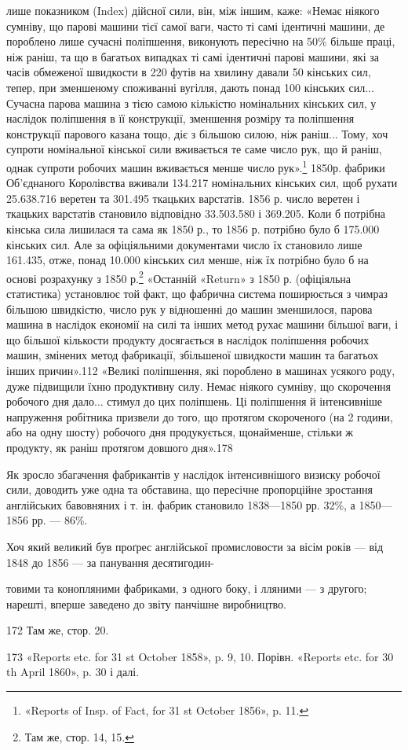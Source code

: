 лише показником (Index) дійсної сили, він, між іншим, каже:
«Немає ніякого сумніву, що парові машини тієї самої ваги, часто
ті самі ідентичні машини, де пороблено лише сучасні поліпшення,
виконують пересічно на 50\% більше праці, ніж раніш, та що в
багатьох випадках ті самі ідентичні парові машини, які за часів
обмеженої швидкости в 220 футів на хвилину давали 50 кінських
сил, тепер, при зменшеному споживанні вугілля, дають понад 100
кінських сил... Сучасна парова машина з тією самою кількістю
номінальних кінських сил, у наслідок поліпшення в її конструкції,
зменшення розміру та поліпшення конструкції парового
казана тощо, діє з більшою силою, ніж раніш... Тому, хоч супроти
номінальної кінської сили вживається те саме число рук, що й
раніш, однак супроти робочих машин вживається менше число
рук».\footnote{
«Reports of Insp. of Fact, for 31 st October 1856», p. 11.
} 1850р. фабрики Об’єднаного Королівства вживали 134.217
номінальних кінських сил, щоб рухати 25.638.716 веретен та
301.495 ткацьких варстатів. 1856 р. число веретен і ткацьких
варстатів становило відповідно 33.503.580 і 369.205. Коли б
потрібна кінська сила лишилася та сама як 1850 р., то 1856 р.
потрібно було б 175.000 кінських сил. Але за офіціяльними документами
число їх становило лише 161.435, отже, понад 10.000
кінських сил менше, ніж їх потрібно було б на основі розрахунку
з 1850 р.\footnote{
Там же, стор. 14, 15.
} «Останній «Return» з 1850 р. (офіціяльна статистика)
установлює той факт, що фабрична система поширюється з чимраз
більшою швидкістю, число рук у відношенні до машин зменшилося,
парова машина в наслідок економії на силі та інших
метод рухає машини більшої ваги, і що більшої кількости продукту
досягається в наслідок поліпшення робочих машин, змінених
метод фабрикації, збільшеної швидкости машин та багатьох інших
причин».112 «Великі поліпшення, які пороблено в машинах
усякого роду, дуже підвищили їхню продуктивну силу. Немає
ніякого сумніву, що скорочення робочого дня дало... стимул
до цих поліпшень. Ці поліпшення й інтенсивніше напруження
робітника призвели до того, що протягом скороченого (на 2 години,
або на одну шосту) робочого дня продукується, щонайменше,
стільки ж продукту, як раніш протягом довшого дня».178

Як зросло збагачення фабрикантів у наслідок інтенсивнішого
визиску робочої сили, доводить уже одна та обставина, що пересічне
пропорційне зростання англійських бавовняних і т. ін.
фабрик становило 1838—1850 рр. 32\%, а 1850—1856 рр. — 86\%.

Хоч який великий був проґрес англійської промисловости
за вісім років — від 1848 до 1856 — за панування десятигодин-

товими та конопляними фабриками, з одного боку, і лляними — з другого;
нарешті, вперше заведено до звіту панчішне виробництво.

172 Там же, стор. 20.

173 «Reports etc. for 31 st October 1858», p. 9, 10. Порівн. «Reports
etc. for 30 th April 1860», p. 30 і далі.
